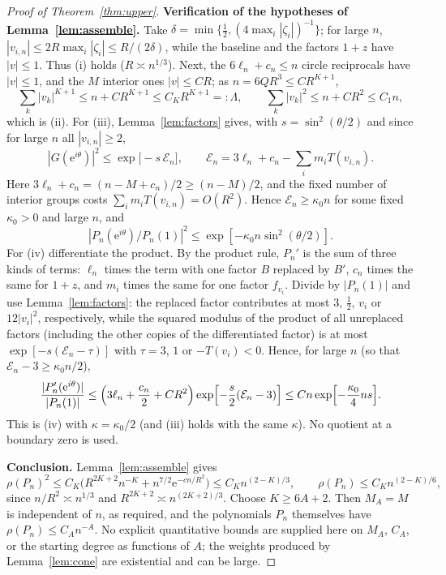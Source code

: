 \documentclass[11pt]{article}
\theoremstyle{remark}\newtheorem{remark}[theorem]{Remark}
\newcommand{\ee}{\mathrm e}
\begin{document}
\begin{proof}[Proof of Theorem~\ref{thm:upper}]
\textbf{Verification of the hypotheses of Lemma~\ref{lem:assemble}.}
Take \(\delta=\min\{\frac12,(4\max_i|\zeta_i|)^{-1}\}\); for large \(n\),
\(|v_{i,n}|\le2R\max_i|\zeta_i|\le R/(2\delta)\), while the baseline and
the factors \(1+z\) have \(|v|\le1\). Thus (i) holds (\(R\asymp n^{1/3}\)).
Next, the \(6\ell_n+c_n\le n\) circle reciprocals have \(|v|\le1\), and the
\(M\) interior ones \(|v|\le CR\); as \(n=6QR^3\le CR^{K+1}\),
\[
 \sum_k|v_k|^{K+1}\le n+CR^{K+1}\le C_KR^{K+1}=:\Lambda,
 \qquad \sum_k|v_k|^2\le n+CR^2\le C_1n,
\]
which is (ii). For (iii), Lemma~\ref{lem:factors} gives, with
\(s=\sin^2(\theta/2)\) and since for large \(n\) all
\(|v_{i,n}|\ge2\),
\[
 |G(\ee^{i\theta})|^2\le\exp\bigl[-s\,\mathcal E_n\bigr],\qquad
 \mathcal E_n=3\ell_n+c_n-\sum_im_iT(v_{i,n}) .
\]
Here \(3\ell_n+c_n=(n-M+c_n)/2\ge(n-M)/2\), and the fixed number of
interior groups costs \(\sum_im_iT(v_{i,n})=O(R^2)\). Hence
\(\mathcal E_n\ge\kappa_0n\) for some fixed \(\kappa_0>0\) and large \(n\), and
\begin{equation}\label{eq:defect-global}
 |P_n(\ee^{i\theta})/P_n(1)|^2\le\exp[-\kappa_0 n\sin^2(\theta/2)] .
\end{equation}
For (iv) differentiate the product. By the product rule,
\(P_n'\) is the sum of three kinds of terms: \(\ell_n\) times the term with one factor
\(B\) replaced by \(B'\), \(c_n\) times the same for \(1+z\), and \(m_i\) times
the same for one factor \(f_{v_i}\). Divide by \(|P_n(1)|\) and
use Lemma~\ref{lem:factors}: the replaced factor contributes
at most \(3\), \(\frac12\), \(v_i\) or \(12|v_i|^2\), respectively, while
the squared modulus of the product of all unreplaced factors
(including the other copies of the differentiated factor) is at most
\(\exp[-s(\mathcal E_n-\tau)]\) with \(\tau=3\), \(1\) or
\(-T(v_i)<0\). Hence, for large \(n\) (so that
\(\mathcal E_n-3\ge\kappa_0n/2\)),
\[
 \frac{|P_n'(\ee^{i\theta})|}{|P_n(1)|}
 \le\Bigl(3\ell_n+\frac{c_n}2+CR^2\Bigr)
 \exp\Bigl[-\frac s2(\mathcal E_n-3)\Bigr]
 \le Cn\exp\Bigl[-\frac{\kappa_0}4ns\Bigr].
\]
This is (iv) with \(\kappa=\kappa_0/2\) (and (iii) holds with
the same \(\kappa\)). No quotient at a boundary zero is used.

\textbf{Conclusion.}
Lemma~\ref{lem:assemble} gives
\[
 \rho(P_n)^2\le C_K\bigl(R^{2K+2}n^{-K}+n^{7/2}\ee^{-cn/R^2}\bigr)
 \le C_Kn^{(2-K)/3},
 \qquad
 \rho(P_n)\le C_Kn^{(2-K)/6},
\]
since \(n/R^2\asymp n^{1/3}\) and \(R^{2K+2}\asymp n^{(2K+2)/3}\).
Choose \(K\ge6A+2\). Then \(M_A=M\) is independent of \(n\),
as required, and the polynomials \(P_n\) themselves have
\(\rho(P_n)\le C_An^{-A}\). No explicit quantitative bounds are supplied here on
\(M_A\), \(C_A\), or the starting degree as functions of \(A\); the weights
produced by Lemma~\ref{lem:cone} are existential and can be large.
\end{proof}
\end{document}
